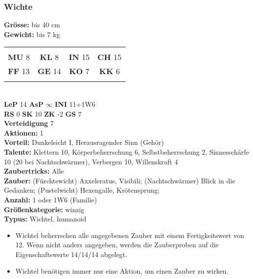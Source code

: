\documentclass[9pt]{article}
\begin{document}
\begin{multicols}{2}
\begin{shaded*}
	\subsubsection{Wichte}
	\textbf{Grösse:} bis 40 cm\\
	\textbf{Gewicht:} bis 7 kg\\
	\begin{tabular}{cccc}
		&&&\\
		\textbf{MU} 8 & \textbf{KL} 8 & \textbf{IN} 15 & \textbf{CH} 15 \\ 
		\textbf{FF} 13 & \textbf{GE} 14 & \textbf{KO} 7 & \textbf{KK} 6 \\
		&&&\\
	\end{tabular}
	\\
	\textbf{LeP} 14 \textbf{AsP} $\infty$	\textbf{INI} 11+1W6 \\
	\textbf{RS} 0 	\textbf{SK} 10	\textbf{ZK} -2 		\textbf{GS} 7 \\
	\textbf{Verteidigung} 7 \\
	\textbf{Aktionen:} 1 \\
	\textbf{Vorteil:} Dunkelsicht I, Herausragender Sinn (Gehör) \\
	\textbf{Talente:} Klettern 10,
	Körperbeherrschung 6,
	Selbstbeherrschung 2,
	Sinnesschärfe 10 (20 bei Nachtschwärmer), Verbergen 10,
	Willenskraft 4
	\\
	\textbf{Zaubertricks:} Alle\\
	\textbf{Zauber:} (Fürchtewicht) Axxeleratus, Visibili; (Nachtschwärmer) Blick in die Gedanken; (Pustelwicht) Hexengalle, Krötensprung;
	\\
	\textbf{Anzahl:} 1 oder 1W6 (Familie) \\
	\textbf{Größenkategorie:} winzig \\
	\textbf{Typus:} Wichtel, humanoid \\
\end{shaded*}

	\begin{itemize}
		\item Wichtel beherrschen alle angegebenen Zauber mit
		einem Fertigkeitswert von 12. Wenn nicht anders
		angegeben, werden die Zauberproben auf die
		Eigenschaftswerte 14/14/14 abgelegt.
		\item Wichtel benötigen immer nur eine Aktion, um einen Zauber zu wirken.
	\end{itemize}
	


\end{multicols}
\end{document}
